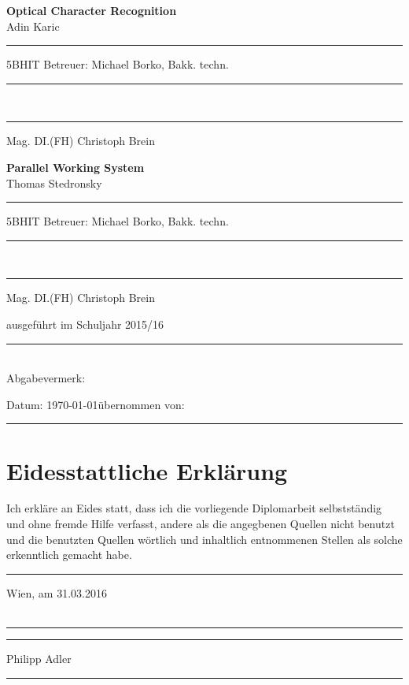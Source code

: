 \documentclass[12pt]{article}
\newcommand\blankpage{%
    \null
    \thispagestyle{empty}%
    \addtocounter{page}{-1}%
    \newpage}
\begin{document}
\begin{titlepage}
\textbf{Optical Character Recognition}\\
Adin Karic \rule[-0.2cm]{1.8cm}{0pt} 5BHIT \hfill Betreuer: Michael Borko, Bakk. techn. \rule[-0.2cm]{0.4cm}{0pt}\\
\rule[-0.2cm]{9.8cm}{0pt} Mag. DI.(FH) Christoph Brein

\textbf{Parallel Working System}\\
Thomas Stedronsky \rule[-0.2cm]{0.2cm}{0pt} 5BHIT \hfill Betreuer: Michael Borko, Bakk. techn. \rule[-0.2cm]{0.4cm}{0pt}\\
\rule[-0.2cm]{9.8cm}{0pt} Mag. DI.(FH) Christoph Brein

\vspace{25mm}

ausgeführt im Schuljahr 2015/16

\rule{1.0\textwidth}{0.3mm}\\
Abgabevermerk: 

Datum: \today \hfill \hfill übernommen von:\rule[-0.2cm]{3cm}{0pt}

\begin{center}

\noindent 

\vfill

\end{center}
\end{titlepage}


\ohead{\headmark}
\ofoot{\pagemark}

\newpage  %
\afterpage{\blankpage}
%
\section*{Eidesstattliche Erklärung}
Ich erkläre an Eides statt, dass ich die vorliegende Diplomarbeit selbstständig und ohne fremde Hilfe verfasst, andere als die angegbenen Quellen nicht benutzt und die benutzten Quellen wörtlich und inhaltlich entnommenen Stellen als solche erkenntlich gemacht habe. \\

\rule[-0.2cm]{1cm}{0pt} Wien, am 31.03.2016 \\ \\

\hfill \hfill \rule[-0.2cm]{6cm}{0.5pt} \rule[-0.2cm]{2cm}{0pt}

\hfill \hfill Philipp Adler \rule[-0.2cm]{5.5cm}{0pt}\\ \\
\end{document}
